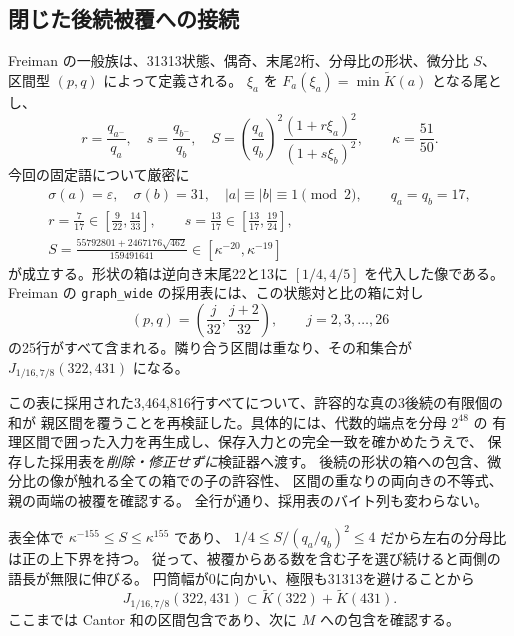 \documentclass[10pt,a4paper]{article}
\newcommand{\eps}{\varepsilon}
\begin{document}
\subsection{閉じた後続被覆への接続}
Freiman の一般族は、31313状態、偶奇、末尾2桁、分母比の形状、微分比 $S$、
区間型 $(p,q)$ によって定義される。
$\xi_a$ を $F_a(\xi_a)=\min\widetilde K(a)$ となる尾とし、
\[
 r=\frac{q_{a^-}}{q_a},\quad s=\frac{q_{b^-}}{q_b},\quad
 S=\left(\frac{q_a}{q_b}\right)^2
       \frac{(1+r\xi_a)^2}{(1+s\xi_b)^2},\qquad \kappa=\frac{51}{50}.
\]
今回の固定語について厳密に
\[
 \begin{gathered}
 \sigma(a)=\eps,\quad\sigma(b)=31,\quad |a|\equiv|b|\equiv1\pmod2,\qquad
 q_a=q_b=17,\\
 r=\frac7{17}\in\left[\frac9{22},\frac{14}{33}\right],\qquad
 s=\frac{13}{17}\in\left[\frac{13}{17},\frac{19}{24}\right],\\
 S=\frac{55792801+2467176\sqrt{462}}{159491641}
   \in[\kappa^{-20},\kappa^{-19}]
 \end{gathered}
\]
が成立する。形状の箱は逆向き末尾22と13に $[1/4,4/5]$ を代入した像である。
Freiman の \texttt{graph\_wide} の採用表には、この状態対と比の箱に対し
\[
 (p,q)=\left(\frac j{32},\frac{j+2}{32}\right),\qquad j=2,3,\ldots,26
\]
の25行がすべて含まれる。隣り合う区間は重なり、その和集合が
$J_{1/16,7/8}(322,431)$ になる。

この表に採用された3,464,816行すべてについて、許容的な真の3後続の有限個の和が
親区間を覆うことを再検証した。具体的には、代数的端点を分母 $2^{48}$ の
有理区間で囲った入力を再生成し、保存入力との完全一致を確かめたうえで、
保存した採用表を\emph{削除・修正せずに}検証器へ渡す。
後続の形状の箱への包含、微分比の像が触れる全ての箱での子の許容性、
区間の重なりの両向きの不等式、親の両端の被覆を確認する。
全行が通り、採用表のバイト列も変わらない。

表全体で $\kappa^{-155}\le S\le\kappa^{155}$ であり、
$1/4\le S/(q_a/q_b)^2\le4$ だから左右の分母比は正の上下界を持つ。
従って、被覆からある数を含む子を選び続けると両側の語長が無限に伸びる。
円筒幅が0に向かい、極限も31313を避けることから
\[
 J_{1/16,7/8}(322,431)\subset\widetilde K(322)+\widetilde K(431).
\]
ここまでは Cantor 和の区間包含であり、次に $M$ への包含を確認する。
\end{document}
